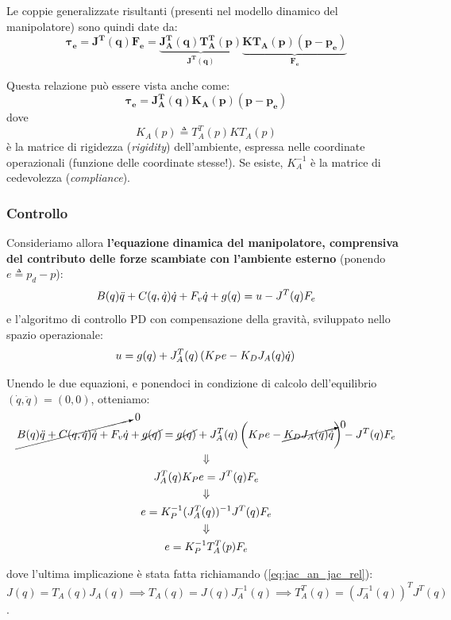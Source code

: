 Le coppie generalizzate risultanti (presenti nel modello dinamico del manipolatore) sono quindi date da:
$$
\boldsymbol{\tau_e = J^T(q)F_e = \underbrace{J_A^T(q)T_A^T(p)}_{J^T(q)} \underbrace{KT_A(p)(p - p_e)}_{F_e}}
$$

Questa relazione può essere vista anche come:
$$
\boldsymbol{\tau_e = J_A^T(q)K_A(p)(p - p_e)}
$$
dove 
\boldmath
\begin{equation}\label{eq:K_a_def}
	K_A(p) \triangleq T_A^T(p)KT_A(p)
\end{equation}
è la matrice di rigidezza (\textit{rigidity}) dell’ambiente, espressa nelle coordinate operazionali (funzione delle coordinate stesse!). Se esiste, $K_A^{-1}$ è la matrice di cedevolezza (\textit{compliance}).



\vspace*{10pt}
\subsubsection{Controllo}
Consideriamo allora \textbf{l’equazione dinamica del manipolatore, comprensiva del contributo delle forze scambiate con l’ambiente esterno} (ponendo $e \triangleq p_d - p$):
$$
B(q)\ddot{q} + C(q, \dot{q})\dot{q} + F_v\dot{q} + g(q) = u - J^T(q)F_e \\
$$
e l’algoritmo di controllo PD con compensazione della gravità, sviluppato nello spazio operazionale:
$$
u = g(q) + J_A^T(q)\left( K_Pe - K_DJ_A(q)\dot{q} \right) \\
$$

Unendo le due equazioni, e ponendoci in condizione di calcolo dell'equilibrio $(\dot{q}, \ddot{q}) = (0,0)$, otteniamo:
\begin{gather*}
	\cancelto{0}{B(q)\ddot{q} + C(q, \dot{q})\dot{q} + F_v\dot{q}} + \cancel{g(q)} = \cancel{g(q)} + J_A^T(q)\left( K_Pe - \cancelto{0}{K_DJ_A(q)\dot{q}} \right) - J^T(q)F_e \\
	\Downarrow \\
	J_A^T(q)K_Pe = J^T(q)F_e \\
	\Downarrow \\
	e = K_P^{-1}(J_A^T(q))^{-1}J^T(q)F_e \\
	\Downarrow \\
	e = K_P^{-1}T_A^T(p)F_e
\end{gather*}
\unboldmath

dove l'ultima implicazione è stata fatta richiamando (\ref{eq:jac_an_jac_rel}): $J(q) = T_A(q)J_A(q) \implies T_A(q)=J(q)J_A^{-1}(q) \implies T_A^T(q)=(J_A^{-1}(q))^T J^T(q)$.

